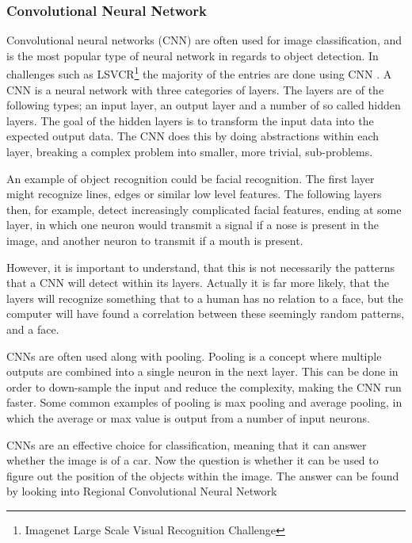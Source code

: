 \subsubsection{Convolutional Neural Network}
\label{sec:cnn}
Convolutional neural networks (CNN) are often used for image classification, and is the most popular type of neural network in regards to object detection.
In challenges such as LSVCR\footnote{Imagenet Large Scale Visual Recognition Challenge} the majority of the entries are done using CNN \cite{ILSVRC_Results}.  
A CNN is a neural network with three categories of layers.
The layers are of the following types; an input layer, an output layer and a number of so called hidden layers.
The goal of the hidden layers is to transform the input data into the expected output data.
The CNN does this by doing abstractions within each layer, breaking a complex problem into smaller, more trivial, sub-problems.

An example of object recognition could be facial recognition.
The first layer might recognize lines, edges or similar low level features.
The following layers then, for example, detect increasingly complicated facial features, ending at some layer, in which one neuron would transmit a signal if a nose is present in the image, and another neuron to transmit if a mouth is present.


However, it is important to understand, that this is not necessarily the patterns that a CNN will detect within its layers.
Actually it is far more likely, that the layers will recognize something that to a human has no relation to a face, but the computer will have found a correlation between these seemingly random patterns, and a face.

CNNs are often used along with pooling.
Pooling is a concept where multiple outputs are combined into a single neuron in the next layer.
This can be done in order to down-sample the input and reduce the complexity, making the CNN run faster.
Some common examples of pooling is max pooling and average pooling, in which the average or max value is output from a number of input neurons.

CNNs are an effective choice for classification, meaning that it can answer whether the image is of a car.
Now the question is whether it can be used to figure out the position of the objects within the image.
The answer can be found by looking into Regional Convolutional Neural Network


